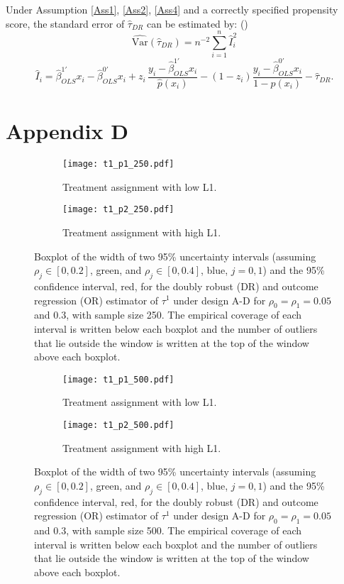 \documentclass[11pt]{article}
\newcommand{\Var}{{\mbox{Var}}}
\begin{document}
 Under Assumption \ref{Ass1}, \ref{Ass2}, \ref{Ass4} and a correctly specified propensity score, the standard error of $\hat \tau_{DR}$ can be estimated by: (\citealp{Lunceford:2004})
$$\widehat{\Var}(\hat{\tau}_{DR}) = n^{-2} \sum \limits_{i =1}^n\hat{I}_i^2$$
\begin{displaymath}
\hat{I}_i= \hat\beta^{1'}_{OLS}x_i-\hat\beta^{0'}_{OLS}x_i
+z_i\, \frac{y_i-\hat\beta^{1'}_{OLS}x_i}{\hat{p}(x_i)}
-(1-z_i)\frac{y_i-\hat\beta^{0'}_{OLS}x_i}{1-\hat{p}(x_i)} -\hat{\tau}_{DR}.
\end{displaymath}

\section*{Appendix D}
\begin{figure} [htbp]
\centering
\begin{subfigure}[b]{\textwidth}
\texttt{[image: t1\_p1\_250.pdf]}
\caption{Treatment assignment with low L1.}
\label{t1.p1.250.fig}
\end{subfigure}
\begin{subfigure}[b]{\textwidth}
\texttt{[image: t1\_p2\_250.pdf]}
\caption{Treatment assignment with high L1.}
\label{t1.p2.250.fig}
\end{subfigure}
\caption{Boxplot of the width of two 95\% uncertainty intervals (assuming $\rho_j \in [0,0.2]$, green, and $\rho_j \in [0,0.4]$, blue, $j=0,1$) and the 95\% confidence interval, red, for the doubly robust (DR) and outcome regression (OR) estimator of $\tau^1$ under design A-D for $\rho_0=\rho_1=0.05$ and $0.3$, with sample size 250. The empirical coverage of each interval is written below each boxplot and the number of outliers that lie outside the window is written at the top of the window above each boxplot.}
\label{t1.250.fig}
\end{figure}


\begin{figure} [htbp]
\centering
\begin{subfigure}[b]{\textwidth}
\texttt{[image: t1\_p1\_500.pdf]}
\caption{Treatment assignment with low L1.}
\label{t1.p1.500.fig}
\end{subfigure}
\begin{subfigure}[b]{\textwidth}
\texttt{[image: t1\_p2\_500.pdf]}
\caption{Treatment assignment with high L1.}
\label{t1.p2.500.fig}
\end{subfigure}
\caption{Boxplot of the width of two 95\% uncertainty intervals (assuming $\rho_j \in [0,0.2]$, green, and $\rho_j \in [0,0.4]$, blue, $j=0,1$) and the 95\% confidence interval, red, for the doubly robust (DR) and outcome regression (OR) estimator of $\tau^1$ under design A-D for $\rho_0=\rho_1=0.05$ and $0.3$, with sample size 500. The empirical coverage of each interval is written below each boxplot and the number of outliers that lie outside the window is written at the top of the window above each boxplot.}
\label{t1.500.fig}
\end{figure}
\end{document}

